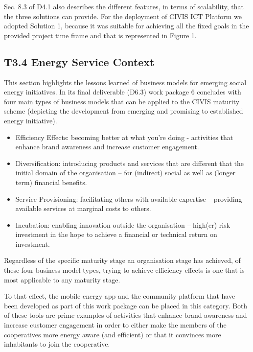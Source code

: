 Sec. 8.3 of D4.1 also describes the different features, in terms of scalability, that the three solutions can provide. For the deployment of CIVIS ICT Platform we adopted Solution 1, because it was suitable for achieving all the fixed goals in the provided project time frame and that is represented in Figure 1.

\subsection{T3.4 Energy Service Context}

This section highlights the lessons learned of business models for emerging social energy initiatives.
In its final deliverable (D6.3) work package 6 concludes with four main types of business models that can be applied to the CIVIS maturity scheme (depicting the development from emerging and promising to established energy initiative). 

\begin{itemize}
\item Efficiency Effects: becoming better at what you're doing - activities that enhance brand awareness and increase customer engagement.
\item Diversification: introducing products and services that are different that the initial domain of the organisation -- for (indirect) social as well as (longer term) financial benefits. 
\item Service Provisioning: facilitating others with available expertise -- providing available services at marginal costs to others.
\item Incubation: enabling innovation outside the organisation -- high(er) risk investment in the hope to achieve a financial or technical return on investment. 
\end{itemize}

Regardless of the specific maturity stage an organisation stage has achieved, of these four business model types, trying to achieve efficiency effects is one that is most applicable to any maturity stage. 

To that effect, the mobile energy app and the community platform that have been developed as part of this work package can be placed in this category. Both of these tools are prime examples of activities that enhance brand awareness and increase customer engagement in order to either make the members of the cooperatives more energy aware (and efficient) or that it convinces more inhabitants to join the cooperative.

